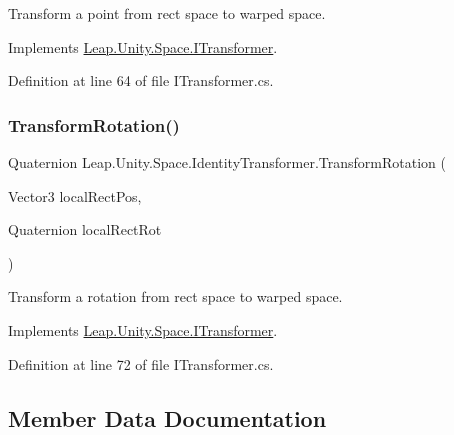 Transform a point from rect space to warped space. 



Implements \mbox{\hyperlink{interface_leap_1_1_unity_1_1_space_1_1_i_transformer_ad4ffef6002e74fe4967c4b7b9d5a5f74}{Leap.\+Unity.\+Space.\+I\+Transformer}}.



Definition at line 64 of file I\+Transformer.\+cs.

\mbox{\label{class_leap_1_1_unity_1_1_space_1_1_identity_transformer_a299300bfabf6eb706fe3f876ca3384c8}} 
\subsubsection{\texorpdfstring{TransformRotation()}{TransformRotation()}}
{\footnotesize\ttfamily Quaternion Leap.\+Unity.\+Space.\+Identity\+Transformer.\+Transform\+Rotation (\begin{DoxyParamCaption}\item[{Vector3}]{local\+Rect\+Pos,  }\item[{Quaternion}]{local\+Rect\+Rot }\end{DoxyParamCaption})}



Transform a rotation from rect space to warped space. 



Implements \mbox{\hyperlink{interface_leap_1_1_unity_1_1_space_1_1_i_transformer_a69931f79b1e951cf38f1b3855e02ba91}{Leap.\+Unity.\+Space.\+I\+Transformer}}.



Definition at line 72 of file I\+Transformer.\+cs.



\subsection{Member Data Documentation}
\mbox{\label{class_leap_1_1_unity_1_1_space_1_1_identity_transformer_a3ec1330730787111258ed33bb4050886}} 
